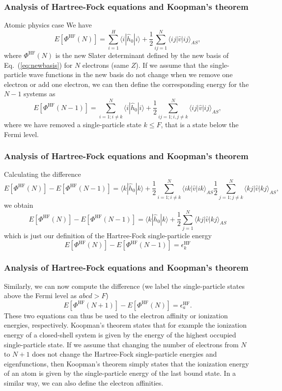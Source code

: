 \documentclass{beamer}
\begin{document}
\begin{frame}
\frametitle{Analysis of Hartree-Fock equations and Koopman's theorem}

\begin{block}{Atomic physics case }
We have 
\[
  E[\Phi^{\mathrm{HF}}(N)] 
  = \sum_{i=1}^H \langle i | \hat{h}_0 | i \rangle +
  \frac{1}{2}\sum_{ij=1}^N\langle ij|\hat{v}|ij\rangle_{AS},
\]
where $\Phi^{\mathrm{HF}}(N)$ is the new Slater determinant defined by the new basis of Eq.~(\ref{eq:newbasis})
for $N$ electrons (same $Z$).  If we assume that the single-particle wave functions in the new basis do not change 
when we remove one electron or add one electron, we can then define the corresponding energy for the $N-1$ systems as 
\[
  E[\Phi^{\mathrm{HF}}(N-1)] 
  = \sum_{i=1; i\ne k}^N \langle i | \hat{h}_0 | i \rangle +
  \frac{1}{2}\sum_{ij=1;i,j\ne k}^N\langle ij|\hat{v}|ij\rangle_{AS},
\]
where we have removed a single-particle state $k\le F$, that is a state below the Fermi level.  
\end{block}
\end{frame}

\begin{frame}
\frametitle{Analysis of Hartree-Fock equations and Koopman's theorem}

\begin{block}{}
Calculating the difference 
\[
  E[\Phi^{\mathrm{HF}}(N)]-   E[\Phi^{\mathrm{HF}}(N-1)] = \langle k | \hat{h}_0 | k \rangle +
  \frac{1}{2}\sum_{i=1;i\ne k}^N\langle ik|\hat{v}|ik\rangle_{AS}  \frac{1}{2}\sum_{j=1;j\ne k}^N\langle kj|\hat{v}|kj\rangle_{AS},
\]
we obtain
\[
  E[\Phi^{\mathrm{HF}}(N)]-   E[\Phi^{\mathrm{HF}}(N-1)] = \langle k | \hat{h}_0 | k \rangle +
  \frac{1}{2}\sum_{j=1}^N\langle kj|\hat{v}|kj\rangle_{AS}
\]
which is just our definition of the Hartree-Fock single-particle energy
\[
  E[\Phi^{\mathrm{HF}}(N)]-   E[\Phi^{\mathrm{HF}}(N-1)] = \epsilon_k^{\mathrm{HF}} 
\]
\end{block}
\end{frame}

\begin{frame}
\frametitle{Analysis of Hartree-Fock equations and Koopman's theorem}

\begin{block}{}
Similarly, we can now compute the difference (we label the single-particle states above the Fermi level as $abcd > F$)
\[
  E[\Phi^{\mathrm{HF}}(N+1)]-   E[\Phi^{\mathrm{HF}}(N)]= \epsilon_a^{\mathrm{HF}}. 
\]
These two equations can thus be used to the electron affinity or ionization energies, respectively. 
Koopman's theorem states that for example the ionization energy of a closed-shell system is given by the energy of the highest occupied single-particle state.  If we assume that changing the number of electrons from $N$ to $N+1$ does not change the Hartree-Fock single-particle energies and eigenfunctions, then Koopman's theorem simply states that the ionization energy of an atom is given by the single-particle energy of the last bound state. In a similar way, we can also define the electron affinities. 
\end{block}
\end{frame}
\end{document}
